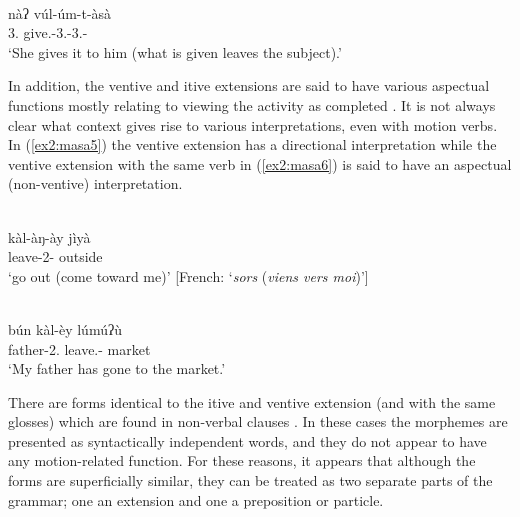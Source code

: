 \ex\label{ex2:masa4}
 \\
\gll nàʔ vúl-úm-t-àsà	\\
3. give.-3.-3.-	\\
\glt `She gives it to him (what is given leaves the subject).' 
\z 

In addition, the ventive and itive extensions are said to have various aspectual functions mostly relating to viewing the activity as completed \citep[216--220]{melisDescriptionMasaTchad1999}. It is not always clear what context gives rise to various interpretations, even with motion verbs. In (\ref{ex2:masa5}) the ventive extension has a directional interpretation while the ventive extension with the same verb in (\ref{ex2:masa6}) is said to have an aspectual (non-ventive) interpretation. 

\ea\label{ex2:masa5}
 \\
\gll kàl-àŋ-ày jìyà	\\
leave-2- outside	\\
\glt `go out (come toward me)' [French: `\textit{sors} (\textit{viens vers moi})']

\ex\label{ex2:masa6}
 \\
\gll bún kàl-èy lúmúʔù	\\
father-2. leave.- market	\\
\glt `My father has gone to the market.' 
\z

There are forms identical to the itive and ventive extension (and with the same glosses) which are found in non-verbal clauses \citep[221]{melisDescriptionMasaTchad1999}. In these cases the morphemes are presented as syntactically independent words, and they do not appear to have any motion-related function. For these reasons, it appears that although the forms are superficially similar, they can be treated as two separate parts of the grammar; one an extension and one a preposition or particle.

